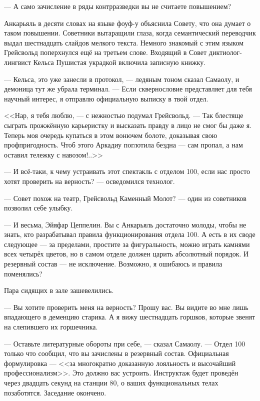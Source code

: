 --- А само зачисление в ряды контрразведки вы не считаете повышением?

Анкарьяль в десяти словах на языке фоуф-у\FM{} объяснила Совету, что она думает о таком повышении.
Советники вытаращили глаза, когда семантический переводчик выдал шестнадцать слайдов мелкого текста.
Немного знакомый с этим языком Грейсвольд поперхнулся ещё на третьем слове.
Входящий в Совет диктиолог-лингвист Кельса Пушистая украдкой включила записную книжку.

--- Кельса, это уже занесли в протокол, --- ледяным тоном сказал Самаолу, и демоница тут же убрала терминал.
--- Если сквернословие представляет для тебя научный интерес, я отправлю официальную выписку в твой отдел.

<<Нар, я тебя люблю, --- с нежностью подумал Грейсвольд.
--- Так блестяще сыграть прожжённую карьеристку и высказать правду в лицо не смог бы даже я.
Теперь моя очередь купаться в этом вонючем болоте, доказывая свою профпригодность.
Чтоб этого Аркадиу поглотила бездна --- сам пропал, а нам оставил тележку с навозом!..>>

--- И всё-таки, к чему устраивать этот спектакль с отделом 100, если нас просто хотят проверить на верность? --- осведомился технолог.

--- Совет похож на театр, Грейсвольд Каменный Молот? --- один из советников позволил себе улыбку.

--- И весьма, Эйяфар Цеппелин.
Вы с Анкарьяль достаточно молоды, чтобы не знать, кто разрабатывал правила функционирования отдела 100.
А есть в их своде следующее --- за пределами, простите за фигуральность, можно играть камнями всех четырёх цветов\FM, но в самом отделе должен царить абсолютный порядок.
И резервный состав --- не исключение.
Возможно, я ошибаюсь и правила поменялись?

Пара сидящих в зале зашевелились.

--- Вы хотите проверить меня на верность?
Прошу вас.
Вы видите во мне лишь впадающего в деменцию старика.
А я вижу шестнадцать горшков, которые звенят на слепившего их горшечника.

--- Оставьте литературные обороты при себе, --- сказал Самаолу.
--- Отдел 100 только что сообщил, что вы зачислены в резервный состав.
Официальная формулировка --- <<за многократно доказанную лояльность и высочайший профессионализм>>.
Это должно вас устроить.
Инструктаж будет проведён через двадцать секунд на станции 80, о ваших функциональных телах позаботятся.
Заседание окончено.

